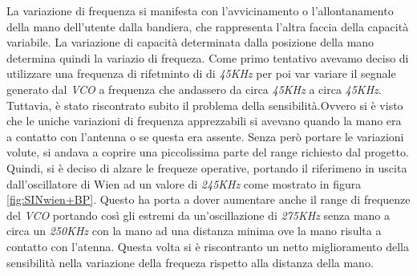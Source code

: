 \documentclass[titlepage]{report}
\begin{document}
	La variazione di frequenza si manifesta con l'avvicinamento o l'allontanamento della mano dell'utente dalla bandiera, che rappresenta l'altra faccia della capacità variabile. La variazione di capacità determinata dalla posizione della mano determina quindi la variazio di frequeza. Come primo tentativo avevamo deciso di utilizzare una frequenza di rifetminto di di \textit{45KHz} per poi var variare il segnale generato dal \textit{VCO} a frequenza che andassero da circa \textit{45KHz} a circa \textit{45KHz}.
	Tuttavia, è stato riscontrato subito il problema della sensibilità.Ovvero si è visto che le uniche variazioni di frequenza apprezzabili si avevano quando la mano era a contatto con l'antenna o se questa era assente. Senza però portare le variazioni volute, si andava a coprire una piccolissima parte del range richiesto dal progetto.
	Quindi, si è deciso di alzare le frequeze operative, portando il riferimeno in uscita dall'oscillatore di Wien ad un valore di \textit{245KHz} come mostrato in figura \ref{fig:SINwien+BP}. Questo ha porta a dover aumentare anche il range di frequenze del \textit{VCO} portando così gli estremi da un'oscillazione di \textit{275KHz} senza mano a circa un \textit{250KHz} con la mano ad una distanza minima ove la mano risulta a contatto con l'atenna.
	Questa volta si è riscontranto un netto miglioramento della sensibilità nella variazione della frequeza rispetto alla distanza della mano.
	

	



	
\end{document}
